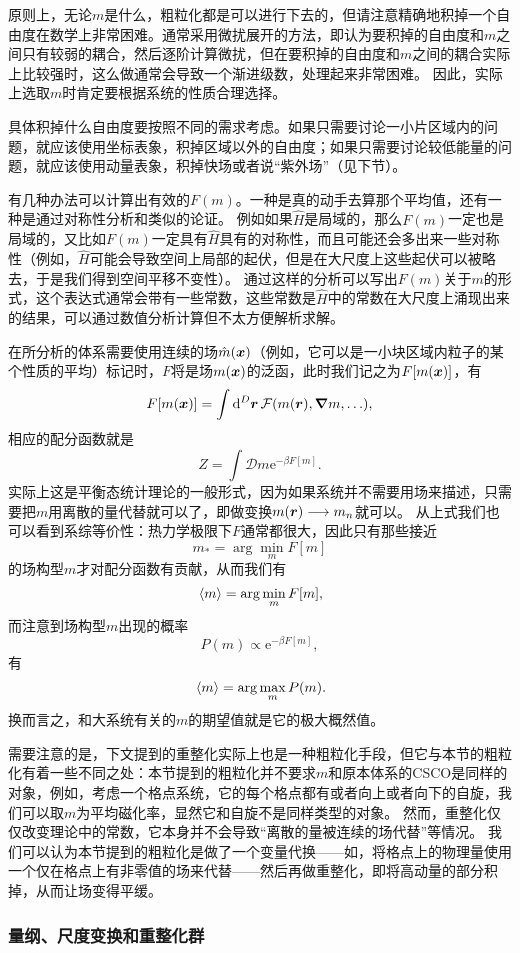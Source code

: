 \documentclass[hyperref, UTF8, a4paper]{ctexart}
\newcommand*{\ee}{\mathrm{e}}
\newcommand*{\fd}[1]{\mathcal{D}{#1}}
\begin{document}
原则上，无论$m$是什么，粗粒化都是可以进行下去的，但请注意精确地积掉一个自由度在数学上非常困难。通常采用微扰展开的方法，即认为要积掉的自由度和$m$之间只有较弱的耦合，然后逐阶计算微扰，但在要积掉的自由度和$m$之间的耦合实际上比较强时，这么做通常会导致一个渐进级数，处理起来非常困难。
因此，实际上选取$m$时肯定要根据系统的性质合理选择。

具体积掉什么自由度要按照不同的需求考虑。如果只需要讨论一小片区域内的问题，就应该使用坐标表象，积掉区域以外的自由度；如果只需要讨论较低能量的问题，就应该使用动量表象，积掉快场或者说“紫外场”（见下节）。

有几种办法可以计算出有效的$F(m)$。一种是真的动手去算那个平均值，还有一种是通过对称性分析和类似的论证。
例如如果$\hat{H}$是局域的，那么$F(m)$一定也是局域的，又比如$F(m)$一定具有$\hat{H}$具有的对称性，而且可能还会多出来一些对称性（例如，$\hat{H}$可能会导致空间上局部的起伏，但是在大尺度上这些起伏可以被略去，于是我们得到空间平移不变性）。
通过这样的分析可以写出$F(m)$关于$m$的形式，这个表达式通常会带有一些常数，这些常数是$\hat{H}$中的常数在大尺度上涌现出来的结果，可以通过数值分析计算但不太方便解析求解。

在所分析的体系需要使用连续的场$\hat{m}(\vb*{x})$（例如，它可以是一小块区域内粒子的某个性质的平均）标记时，$F$将是场$m(\vb*{x})$的泛函，此时我们记之为$F[m(\vb*{x})]$，有
\[
    F[m(\vb*{x})] = \int \dd[D]{\vb*{r}} \mathcal{F}(m(\vb*{r}), \grad{m}, \ldots), 
\]
相应的配分函数就是
\[
    Z = \int \fd{m} \ee^{- \beta F[m]}.
\]
实际上这是平衡态统计理论的一般形式，因为如果系统并不需要用场来描述，只需要把$m$用离散的量代替就可以了，即做变换$m(\vb*{r}) \longrightarrow m_n$就可以。
从上式我们也可以看到系综等价性：热力学极限下$F$通常都很大，因此只有那些接近
\[
    m_* = \arg\min_m F[m]
\]
的场构型$m$才对配分函数有贡献，从而我们有
\[
    \expval*{m} = \arg\min_m F[m],
\]
而注意到场构型$m$出现的概率
\[
    P(m) \propto \ee^{-\beta F[m]},
\]
有
\[
    \expval*{m} = \arg\max_m P(m).
\]
换而言之，和大系统有关的$m$的期望值就是它的极大概然值。

需要注意的是，下文提到的重整化实际上也是一种粗粒化手段，但它与本节的粗粒化有着一些不同之处：本节提到的粗粒化并不要求$m$和原本体系的CSCO是同样的对象，例如，考虑一个格点系统，它的每个格点都有或者向上或者向下的自旋，我们可以取$m$为平均磁化率，显然它和自旋不是同样类型的对象。
然而，重整化仅仅改变理论中的常数，它本身并不会导致“离散的量被连续的场代替”等情况。
我们可以认为本节提到的粗粒化是做了一个变量代换——如，将格点上的物理量使用一个仅在格点上有非零值的场来代替——然后再做重整化，即将高动量的部分积掉，从而让场变得平缓。

\subsubsection{量纲、尺度变换和重整化群}
\end{document}
